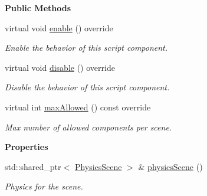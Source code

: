 \begin{Indent}\textbf{ Public Methods}\par
\begin{DoxyCompactItemize}
\item 
\mbox{\label{classrev_1_1_physics_scene_component_a6f91f47ec481c341b5d535d421824103}} 
virtual void \mbox{\hyperlink{classrev_1_1_physics_scene_component_a6f91f47ec481c341b5d535d421824103}{enable}} () override
\begin{DoxyCompactList}\small\item\em Enable the behavior of this script component. \end{DoxyCompactList}\item 
\mbox{\label{classrev_1_1_physics_scene_component_a07fc5100f1e047a3e992802c296c1744}} 
virtual void \mbox{\hyperlink{classrev_1_1_physics_scene_component_a07fc5100f1e047a3e992802c296c1744}{disable}} () override
\begin{DoxyCompactList}\small\item\em Disable the behavior of this script component. \end{DoxyCompactList}\item 
\mbox{\label{classrev_1_1_physics_scene_component_a3cafe0564c1ef3c2eb712ee6af6a2b1e}} 
virtual int \mbox{\hyperlink{classrev_1_1_physics_scene_component_a3cafe0564c1ef3c2eb712ee6af6a2b1e}{max\+Allowed}} () const override
\begin{DoxyCompactList}\small\item\em Max number of allowed components per scene. \end{DoxyCompactList}\end{DoxyCompactItemize}
\end{Indent}
\begin{Indent}\textbf{ Properties}\par
\begin{DoxyCompactItemize}
\item 
\mbox{\label{classrev_1_1_physics_scene_component_a3a64c29ff18f4296684585d92c93695e}} 
std\+::shared\+\_\+ptr$<$ \mbox{\hyperlink{classrev_1_1_physics_scene}{Physics\+Scene}} $>$ \& \mbox{\hyperlink{classrev_1_1_physics_scene_component_a3a64c29ff18f4296684585d92c93695e}{physics\+Scene}} ()
\begin{DoxyCompactList}\small\item\em Physics for the scene. \end{DoxyCompactList}\end{DoxyCompactItemize}
\end{Indent}

